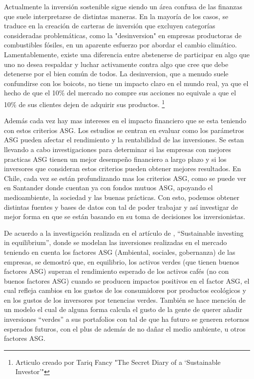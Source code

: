 \vspace{0.5cm}

Actualmente la inversión sostenible sigue siendo un área confusa de las finanzas que suele interpretarse de distintas maneras. En la mayoría de los casos, se traduce en la creación de carteras de inversión que excluyen categorías consideradas problemáticas, como la "desinversion" en empresas productoras de combustibles fósiles, en un aparente esfuerzo por abordar el cambio climático. Lamentablemente, existe una diferencia entre abstenerse de participar en algo que uno no desea respaldar y luchar activamente contra algo que cree que debe detenerse por el bien común de todos. La desinversion, que a menudo suele confundirse con los boicots, no tiene un impacto claro en el mundo real, ya que el hecho de que el 10\% del mercado no compre sus acciones no equivale a que el 10\% de sus clientes dejen de adquirir sus productos. \footnote{Articulo creado por Tariq Fancy "The Secret Diary of a ‘Sustainable Investor’"}

\vspace{0.5cm}

Además cada vez hay mas intereses en el impacto financiero que se esta teniendo con estos criterios ASG. Los estudios se centran en evaluar como los parámetros ASG pueden afectar el rendimiento y la rentabilidad de las inversiones. Se estan llevando a cabo investigaciones para determinar si las empresas con mejores practicas ASG tienen un mejor desempeño financiero a largo plazo y si los inversores que consideran estos criterios pueden obtener mejores resultados. En Chile, cada vez se están profundizando mas los criterios ASG, como se puede ver en Santander donde cuentan ya con fondos mutuos ASG, apoyando el medioambiente, la sociedad y las buenas prácticas. Con esto, podemos obtener distintas fuentes y bases de datos con tal de poder trabajar y así investigar de mejor forma en que se están basando en su toma de decisiones los inversionistas.

\vspace{0.5cm}

De acuerdo a la investigación realizada en el artículo de , “Sustainable investing in equilibrium”, donde se modelan las inversiones realizadas en el mercado teniendo en cuenta los factores ASG (Ambiental, sociales, gobernanza) de las empresas, se demostró que, en equilibrio, los activos verdes (que tienen buenos factores ASG) superan el rendimiento esperado de los activos cafés (no con buenos factores ASG) cuando se producen impactos positivos en el factor ASG, el cual refleja cambios en los gustos de los consumidores por productos ecológicos y en los gustos de los inversores por tenencias verdes. También se hace mención de un modelo el cual de alguna forma calcula el gusto de la gente de querer añadir inversiones “verdes” a sus portafolios con tal de que ha futuro se generen retornos esperados futuros, con el plus de además de no dañar el medio ambiente, u otros factores ASG. 

